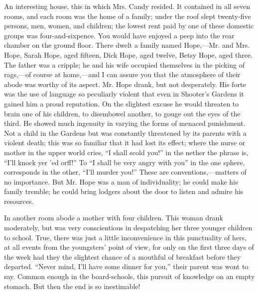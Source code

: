An interesting house, this in which Mrs. Candy resided. It contained in
all seven rooms, and each room was the home of a family; under the roof
slept twenty-five persons, men, women, and children; the lowest rent
paid by one of these domestic groups was four-and-sixpence. You would
have enjoyed a peep into the rear chamber on the ground floor. There
dwelt a family named Hope,---Mr. and Mrs. Hope, Sarah Hope, aged
fifteen, Dick Hope, aged twelve, Betsy Hope, aged three. The father was
a cripple; he and his wife occupied themselves in the picking of
rags,---of course at home,---and I can assure you that the atmosphere of
their abode was worthy of its aspect. Mr. Hope drank, but not
desperately. His forte was the use of language so peculiarly violent
that even in Shooter's Gardens it gained him a proud reputation. On the
slightest excuse he would threaten to brain one of his children, to
disembowel another, to gouge out the eyes of the
{\protect\hypertarget{6}{}{}}third. He showed much ingenuity in varying
the forms of menaced punishment. Not a child in the Gardens but was
constantly threatened by its parents with a violent death; this was so
familiar that it had lost its effect; where the nurse or mother in the
upper world cries, ``I shall scold you!'' in the nether the phrase is,
``I'll knock yer 'ed orff!'' To ``I shall be very angry with you'' in
the one sphere, corresponds in the other, ``I'll murder you!'' These are
conventions,---matters of no importance. But Mr. Hope was a man of
individuality; he could make his family tremble; he could bring lodgers
about the door to listen and admire his resources.

In another room abode a mother with four children. This woman drank
moderately, but was very conscientious in despatching her three younger
children to school. True, there was just a little inconvenience in this
punctuality of hers, at all events from the youngsters' point of view,
for only on the first three days of the week had they the slightest
chance of a mouthful of breakfast before they departed. ``Never mind,
I'll have some dinner for you,'' their parent was wont to say. Common
enough {\protect\hypertarget{7}{}{}}in the board-schools, this pursuit
of knowledge on an empty stomach. But then the end is so inestimable!

